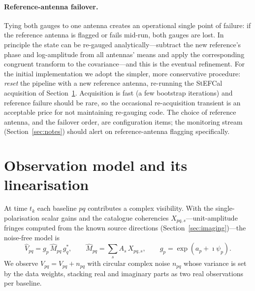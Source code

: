 \documentclass[11pt]{article}
\begin{document}
\paragraph{Reference-antenna failover.} Tying both gauges to one antenna creates an operational
single point of failure: if the reference antenna is flagged or fails mid-run, both gauges are lost.
In principle the state can be re-gauged analytically---subtract the new reference's phase and
log-amplitude from all antennas' means and apply the corresponding congruent transform to the
covariance---and this is the eventual refinement. For the initial implementation we adopt the
simpler, more conservative procedure: \emph{reset} the pipeline with a new reference antenna,
re-running the StEFCal acquisition of Section~\ref{sec:obs}. Acquisition is fast (a few bootstrap
iterations) and reference failure should be rare, so the occasional re-acquisition transient is an
acceptable price for not maintaining re-gauging code. The choice of reference antenna, and the
failover order, are configuration items; the monitoring stream (Section~\ref{sec:notes}) should
alert on reference-antenna flagging specifically.

\section{Observation model and its linearisation}
\label{sec:obs}

At time $t_k$ each baseline $pq$ contributes a complex visibility. With the
single-polarisation scalar gains and the catalogue coherencies $X_{pq,s}$---unit-amplitude
fringes computed from the known source directions (Section~\ref{sec:imaging})---the noise-free
model is
\begin{equation}
  \hat V_{pq} = g_p\,\hat M_{pq}\,g_q^{\ast},\qquad
  \hat M_{pq}=\sum_{s} A_s\,X_{pq,s},\qquad
  g_p=\exp(a_p+\imath\psi_p).
  \label{eq:model}
\end{equation}
We observe $V_{pq}=\hat V_{pq}+n_{pq}$ with circular complex noise $n_{pq}$ whose variance is
set by the data weights, stacking real and imaginary parts as two real observations per
baseline.
\end{document}
